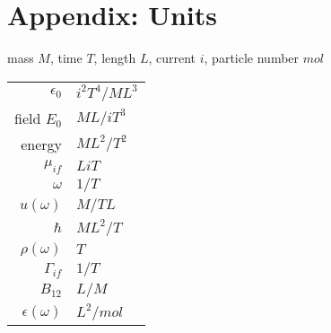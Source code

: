 \section{Appendix: Units }

mass $M$, time $T$, length $L$, current $i$, particle number $mol$

\begin{tabular}{rl}
   $\epsilon_0$  & $i^2 T^4 / M L^3$ \\
    field $E_0$ & $M L / i T^3$ \\
    energy & $M L^2 / T^2$ \\
    $\mu_{if}$ & $ L i T$ \\
    $\omega$ & $1/T$ \\
    $u(\omega)$ & $M / T L$ \\
    $\hbar$ & $ M L^2 / T$ \\
    $\rho(\omega) $ & $T$ \\
    $\Gamma_{if}$ & $ 1/T$ \\
    $B_{12}$ & $ L / M$ \\
  $\epsilon(\omega)$ & $L^2 / mol$
\end{tabular}


\printbibliography[segment=\therefsegment,heading=subbibliography]
